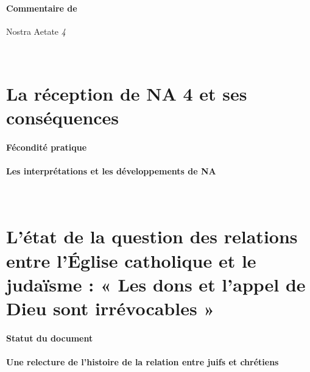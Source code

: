   
    
    \paragraph{Commentaire de} Nostra Aetate \emph{4}
    
  
 ~
  \hypertarget{la-ruxe9ception-de-na-4-et-ses-consuxe9quences}{%
  \section{La réception de NA 4 et ses
  conséquences}\label{la-ruxe9ception-de-na-4-et-ses-consuxe9quences}}

  
  \def\labelenumii{\arabic{enumii}.}
  
    
    \paragraph{Fécondité pratique}
    
  
    
    \paragraph{Les interprétations et les développements de NA}
    
  
 ~
  \hypertarget{luxe9tat-de-la-question-des-relations-entre-luxe9glise-catholique-et-le-judauxefsme-les-dons-et-lappel-de-dieu-sont-irruxe9vocables}{%
  \section{L'état de la question des relations entre l'Église catholique
  et le judaïsme : « Les dons et l'appel de Dieu sont irrévocables
  »}\label{luxe9tat-de-la-question-des-relations-entre-luxe9glise-catholique-et-le-judauxefsme-les-dons-et-lappel-de-dieu-sont-irruxe9vocables}}

  
 
  
    
    \paragraph{Statut du document}
    
  
    
    \paragraph{Une relecture de l'histoire de la relation entre juifs et
    chrétiens}
    

